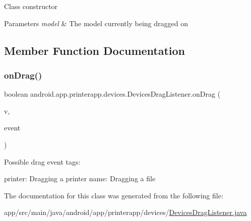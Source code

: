 Class constructor 
\begin{DoxyParams}{Parameters}
{\em model} & The model currently being dragged on \\
\hline
\end{DoxyParams}


\subsection{Member Function Documentation}
\mbox{\label{classandroid_1_1app_1_1printerapp_1_1devices_1_1_devices_drag_listener_a8a7274ff7b0bd924b5f96e9da841c4ce}} 
\subsubsection{\texorpdfstring{on\+Drag()}{onDrag()}}
{\footnotesize\ttfamily boolean android.\+app.\+printerapp.\+devices.\+Devices\+Drag\+Listener.\+on\+Drag (\begin{DoxyParamCaption}\item[{View}]{v,  }\item[{Drag\+Event}]{event }\end{DoxyParamCaption})}

Possible drag event tags\+:

printer\+: Dragging a printer name\+: Dragging a file 

The documentation for this class was generated from the following file\+:\begin{DoxyCompactItemize}
\item 
app/src/main/java/android/app/printerapp/devices/\hyperlink{_devices_drag_listener_8java}{Devices\+Drag\+Listener.\+java}\end{DoxyCompactItemize}
